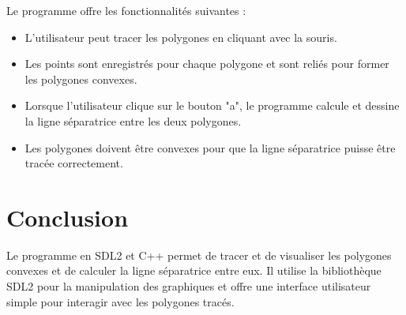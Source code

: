\documentclass{article}
\theoremstyle{definition}
\theoremstyle{plain}
\begin{document}
Le programme offre les fonctionnalités suivantes :

\begin{itemize}
  \item L'utilisateur peut tracer les polygones en cliquant avec la souris.
  \item Les points sont enregistrés pour chaque polygone et sont reliés pour former les polygones convexes.
  \item Lorsque l'utilisateur clique sur le bouton "a", le programme calcule et dessine la ligne séparatrice entre les deux polygones.
  \item Les polygones doivent être convexes pour que la ligne séparatrice puisse être tracée correctement.
\end{itemize}

\section{Conclusion}
\cite{Dixmier}
Le programme en SDL2 et C++ permet de tracer et de visualiser les polygones convexes et de calculer la ligne séparatrice entre eux. Il utilise la bibliothèque SDL2 pour la manipulation des graphiques et offre une interface utilisateur simple pour interagir avec les polygones tracés.

\printbibliography
\end{document}
